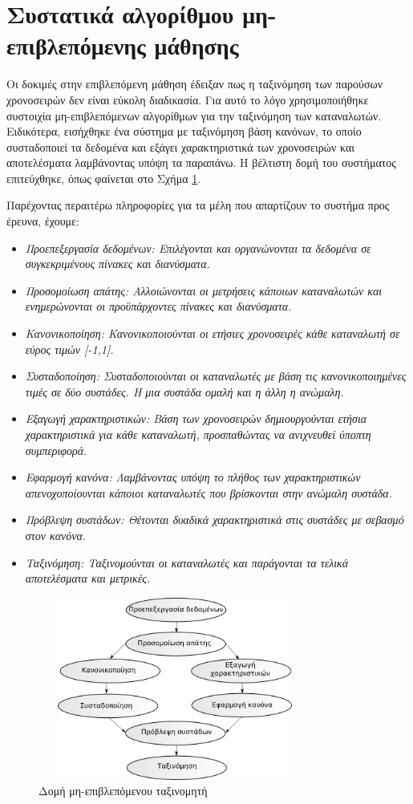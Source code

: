 \section{Συστατικά αλγορίθμου μη-επιβλεπόμενης μάθησης}
Οι δοκιμές στην επιβλεπόμενη μάθηση έδειξαν πως η ταξινόμηση των παρούσων χρονοσειρών δεν είναι εύκολη διαδικασία. Για αυτό το λόγο χρησιμοποιήθηκε συστοιχία μη-επιβλεπόμενων αλγορίθμων για την ταξινόμηση των καταναλωτών. Ειδικότερα, εισήχθηκε ένα σύστημα με ταξινόμηση βάση κανόνων, το οποίο συσταδοποιεί τα δεδομένα και εξάγει χαρακτηριστικά των χρονοσειρών και αποτελέσματα λαμβάνοντας υπόψη τα παραπάνω. Η βέλτιστη δομή του συστήματος επιτεύχθηκε, όπως φαίνεται στο Σχήμα \ref{fig:unsupervisedsystem}.\par
Παρέχοντας περαιτέρω πληροφορίες για τα μέλη που απαρτίζουν το συστήμα προς έρευνα, έχουμε:
\begin{itemize}
\item \em{Προεπεξεργασία δεδομένων}: Επιλέγονται και οργανώνονται τα δεδομένα σε συγκεκριμένους πίνακες και διανύσματα.
\item \em{Προσομοίωση απάτης}: Αλλοιώνονται οι μετρήσεις κάποιων καταναλωτών και ενημερώνονται οι προϋπάρχοντες πίνακες και διανύσματα.
\item \em{Κανονικοποίηση}: Κανονικοποιούνται οι ετήσιες χρονοσειρές κάθε καταναλωτή σε εύρος τιμών [-1,1].
\item \em{Συσταδοποίηση}: Συσταδοποιούνται οι καταναλωτές με βάση τις κανονικοποιημένες τιμές σε δύο συστάδες. Η μια συστάδα ομαλή και η άλλη η ανώμαλη. 
\item \em{Εξαγωγή χαρακτηριστικών}: Βάση των χρονοσειρών δημιουργούνται ετήσια χαρακτηριστικά για κάθε καταναλωτή, προσπαθώντας να ανιχνευθεί ύποπτη συμπεριφορά.
\item \em{Εφαρμογή κανόνα}: Λαμβάνοντας υπόψη το πλήθος των χαρακτηριστικών απενοχοποίουνται κάποιοι καταναλωτές που βρίσκονται στην ανώμαλη συστάδα.
\item \em{Πρόβλεψη συστάδων}: Θέτονται δυαδικά χαρακτηριστικά στις συστάδες με σεβασμό στον κανόνα.
\item \em{Ταξινόμηση}: Ταξινομούνται οι καταναλωτές και παράγονται τα τελικά αποτελέσματα και μετρικές.
\end{itemize}
\begin{figure}
\centering
 \includegraphics[width=90mm, height=60mm]{../../plots/systems/un_supervised.png}
 \caption{Δομή μη-επιβλεπόμενου ταξινομητή}
\label{fig:unsupervisedsystem}
 \end{figure}
 
